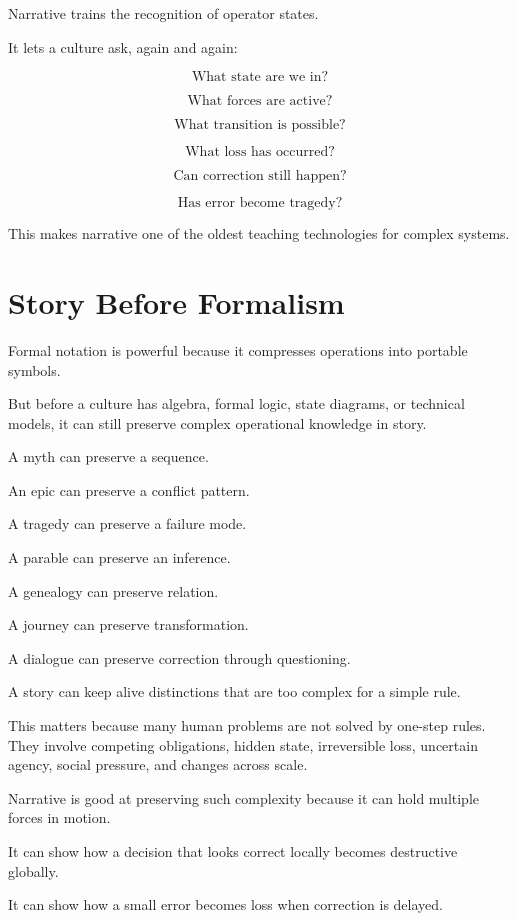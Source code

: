 \documentclass[11pt]{book}
\begin{document}
Narrative trains the recognition of operator states.

It lets a culture ask, again and again:

\[
\text{What state are we in?}
\]

\[
\text{What forces are active?}
\]

\[
\text{What transition is possible?}
\]

\[
\text{What loss has occurred?}
\]

\[
\text{Can correction still happen?}
\]

\[
\text{Has error become tragedy?}
\]

This makes narrative one of the oldest teaching technologies for complex systems.

\section{Story Before Formalism}

Formal notation is powerful because it compresses operations into portable symbols.

But before a culture has algebra, formal logic, state diagrams, or technical models, it can still preserve complex operational knowledge in story.

A myth can preserve a sequence.

An epic can preserve a conflict pattern.

A tragedy can preserve a failure mode.

A parable can preserve an inference.

A genealogy can preserve relation.

A journey can preserve transformation.

A dialogue can preserve correction through questioning.

A story can keep alive distinctions that are too complex for a simple rule.

This matters because many human problems are not solved by one-step rules. They involve competing obligations, hidden state, irreversible loss, uncertain agency, social pressure, and changes across scale.

Narrative is good at preserving such complexity because it can hold multiple forces in motion.

It can show how a decision that looks correct locally becomes destructive globally.

It can show how a small error becomes loss when correction is delayed.
\end{document}
